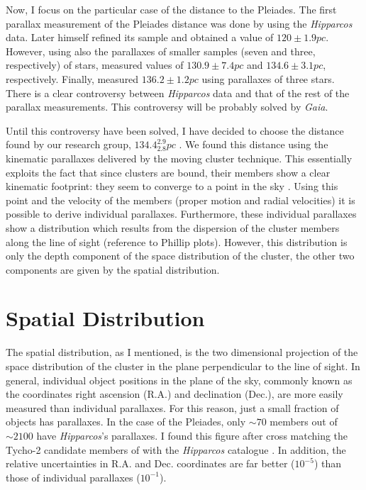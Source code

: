 Now, I focus on the particular case of the distance to the Pleiades. The first parallax measurement of the Pleiades distance was done by \citet{1999A&A...341L..71V} using the \emph{Hipparcos} data. Later himself \citep{2009A&A...497..209V} refined its sample and obtained a value of $120\pm1.9pc$. However, \citet{2000ApJ...533..938G, 2005AJ....129.1616S} using also the parallaxes of smaller samples (seven and three, respectively) of stars, measured values of $130.9\pm7.4pc$ and $134.6\pm3.1pc$, respectively. Finally, \citet{2014Sci...345.1029M} measured $136.2\pm1.2pc$ using parallaxes of three stars. There is a clear controversy between \emph{Hipparcos} data and that of the rest of the parallax measurements. This controversy will be probably solved by \emph{Gaia}. 

Until this controversy have been solved, I have decided to choose the distance found by our research group, $134.4^{2.9}_{2.8}pc$ \citep{Galli2017}. We found this distance using the kinematic parallaxes delivered by the moving cluster technique. This essentially exploits the fact that since clusters are bound, their members show a clear kinematic footprint: they seem to converge to a point in the sky \citep{1964IAUS...20...50B}. Using this point and the velocity of the members (proper motion and radial velocities) it is possible to derive individual parallaxes. Furthermore, these individual parallaxes show a distribution which results from the dispersion of the cluster members along the line of sight (reference to Phillip plots). However, this distribution is only the depth component of the space distribution of the cluster, the other two components are given by the spatial distribution. 

\section{Spatial Distribution}
The spatial distribution, as I mentioned, is the two dimensional projection of the space distribution of the cluster in the plane perpendicular to the line of sight. In general, individual object positions in the plane of the sky, commonly known as the coordinates right ascension (R.A.) and declination (Dec.), are more easily measured than individual parallaxes. For this reason, just a small fraction of objects has parallaxes. In the case of the Pleiades, only $\sim70$ members out of $\sim2100$ have \emph{Hipparcos}'s parallaxes. I found this figure after cross matching the Tycho-2 candidate members of \citet{Bouy2015} with the \emph{Hipparcos} catalogue \citep{1997A&A...323L..49P} . In addition, the relative uncertainties in R.A. and Dec. coordinates are far better ($10^{-5}$) than those of individual parallaxes ($10^{-1}$).

